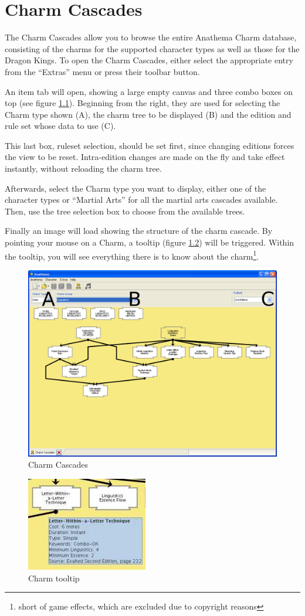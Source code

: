 \chapter{Charm Cascades}
The Charm Cascades allow you to browse the entire Anathema Charm database, consisting of the charms for the supported character types as well as those for the Dragon Kings. To open the Charm Cascades, either select the appropriate entry from the ``Extras'' menu or press their toolbar button.

An item tab will open, showing a large empty canvas and three combo boxes on top (see figure \ref{fig:CharmCascades}). Beginning from the right, they are used for selecting the Charm type shown (A), the charm tree to be displayed (B) and the edition and rule set whose data to use (C).

This last box, ruleset selection, should be set first, since changing editions forces the view to be reset. Intra-edition changes are made on the fly and take effect instantly, without reloading the charm tree.

Afterwards, select the Charm type you want to display, either one of the character types or ``Martial Arts'' for all the martial arts cascades available. Then, use the tree selection box to choose from the available trees.

Finally an image will load showing the structure of the charm cascade. By pointing your mouse on a Charm, a tooltip  (figure \ref{fig:CharmTooltip}) will be triggered. Within the tooltip, you will see everything there is to know about the charm\footnote{short of game effects, which are excluded due to copyright reasons}.

\begin{figure}[htbp]
	\centering
		\includegraphics[width=1.00\textwidth]{images/CharmCascades.png}
	\caption{Charm Cascades}
	\label{fig:CharmCascades}
\end{figure}


\begin{figure}[htbp]
	\centering
		\includegraphics{images/CharmTooltip.jpg}
	\caption{Charm tooltip}
	\label{fig:CharmTooltip}
\end{figure}